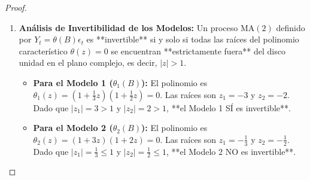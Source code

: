 \documentclass[11pt,letterpaper]{article}
\begin{document}
\begin{proof}
\begin{enumerate}
    \item \textbf{Análisis de Invertibilidad de los Modelos:}
    Un proceso $\text{MA}(2)$ definido por $Y_t = \theta(B)\epsilon_t$ es **invertible** si y solo si todas las raíces del polinomio característico $\theta(z) = 0$ se encuentran **estrictamente fuera** del disco unidad en el plano complejo, es decir, $|z| > 1$.

    \begin{itemize}
        \item \textbf{Para el Modelo 1 ($\theta_1(B)$):}
        El polinomio es $\theta_1(z) = \left(1 + \frac{1}{3}z\right)\left(1 + \frac{1}{2}z\right) = 0$.
        Las raíces son $z_1 = -3$ y $z_2 = -2$.
        Dado que $|z_1| = 3 > 1$ y $|z_2| = 2 > 1$, **el Modelo 1 SÍ es invertible**.

        \item \textbf{Para el Modelo 2 ($\theta_2(B)$):}
        El polinomio es $\theta_2(z) = (1 + 3z)(1 + 2z) = 0$.
        Las raíces son $z_1 = -\frac{1}{3}$ y $z_2 = -\frac{1}{2}$.
        Dado que $|z_1| = \frac{1}{3} \le 1$ y $|z_2| = \frac{1}{2} \le 1$, **el Modelo 2 NO es invertible**.
    \end{itemize}
\end{enumerate}
\end{proof}
\end{document}
